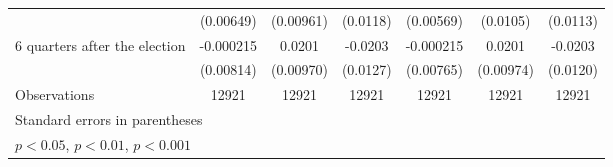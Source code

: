\begin{table}[htbp]
\begin{tabular}{l*{6}{c}}
                    &   (0.00649)         &   (0.00961)         &    (0.0118)         &   (0.00569)         &    (0.0105)         &    (0.0113)         \\
[1em]
 6 quarters after the election&   -0.000215         &      0.0201\sym{*}  &     -0.0203         &   -0.000215         &      0.0201\sym{*}  &     -0.0203         \\
                    &   (0.00814)         &   (0.00970)         &    (0.0127)         &   (0.00765)         &   (0.00974)         &    (0.0120)         \\
\hline
Observations        &       12921         &       12921         &       12921         &       12921         &       12921         &       12921         \\
\hline\hline
\multicolumn{7}{l}{\footnotesize Standard errors in parentheses}\\
\multicolumn{7}{l}{\footnotesize \sym{*} \(p<0.05\), \sym{**} \(p<0.01\), \sym{***} \(p<0.001\)}\\
\end{tabular}
\end{table}
